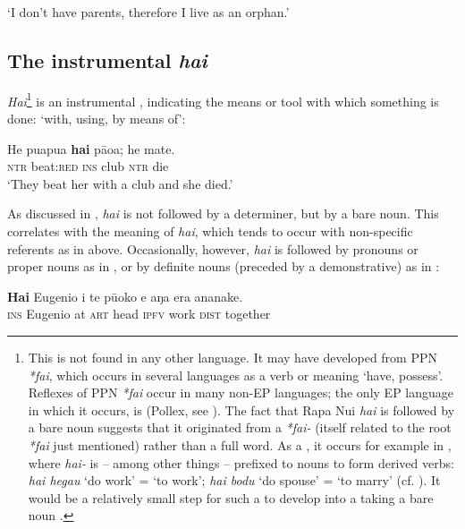 \glt 
‘I don’t have parents, therefore I live as an orphan.’ \textstyleExampleref{[R214.013]} 
\z
{}
\subsection{The instrumental  \textit{hai}}\label{sec:4.7.9}
\textit{Hai}\footnote{\label{fn:239}This  is not found in any other language. It may have developed from PPN \textit{*fai}, which occurs in several languages as a verb or  meaning ‘have, possess’. Reflexes of PPN \textit{*fai} occur in many non-EP languages; the only EP language in which it occurs, is  (Pollex, see \citealt{GreenhillClark2011}). The fact that Rapa Nui \textit{hai} is followed by a bare noun suggests that it originated from a  \textit{*fai-}  (itself related to the root \textit{*fai} just mentioned) rather than a full word. As a , it occurs for example in , where \textit{hai-} is – among other things – prefixed to nouns to form derived verbs: \textit{hai hegau} ‘do work’ = ‘to work’; \textit{hai bodu} ‘do spouse’ = ‘to marry’ (cf. \citealt[628]{CarrollSoulik1973}). It would be a relatively small step for such a  to develop into a  taking a bare noun .} is an instrumental , indicating the means or tool with which something is done: ‘with, using, by means of’:

\ea\label{ex:4.297}
\gll He pu{\ꞌ}apu{\ꞌ}a \textbf{hai} pāoa; he mate.\\
\textsc{ntr} beat:\textsc{red} \textsc{ins} club \textsc{ntr} die\\

\glt
‘They beat her with a club and she died.’ \textstyleExampleref{[Egt-01.082]}
\z

As discussed in , \textit{hai} is not followed by a determiner, but by a bare noun. This correlates with the meaning of \textit{hai}, which tends to occur with non-specific referents as in  above. Occasionally, however, \textit{hai} is followed by pronouns or proper nouns as in , or by definite nouns (preceded by a demonstrative) as in :

\ea\label{ex:4.298}
\gll \textbf{Hai} Eugenio {\ꞌ}i te pū{\ꞌ}oko e aŋa era ananake.\\
\textsc{ins} Eugenio at \textsc{art} head \textsc{ipfv} work \textsc{dist} together\\

